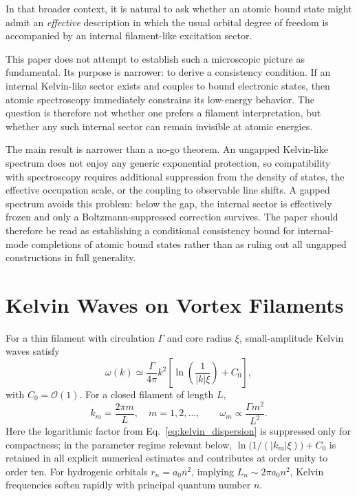 \documentclass[pdflatex,sn-mathphys-num]{sn-jnl}
\begin{document}
        In that broader context, it is natural to ask whether an atomic bound state might admit an \emph{effective} description in which the usual orbital degree of freedom is accompanied by an internal filament-like excitation sector.

        This paper does not attempt to establish such a microscopic picture as fundamental. Its purpose is narrower: to derive a consistency condition. If an internal Kelvin-like sector exists and couples to bound electronic states, then atomic spectroscopy immediately constrains its low-energy behavior. The question is therefore not whether one prefers a filament interpretation, but whether any such internal sector can remain invisible at atomic energies.

        The main result is narrower than a no-go theorem. An ungapped Kelvin-like spectrum does not enjoy any generic exponential protection, so compatibility with spectroscopy requires additional suppression from the density of states, the effective occupation scale, or the coupling to observable line shifts. A gapped spectrum avoids this problem: below the gap, the internal sector is effectively frozen and only a Boltzmann-suppressed correction survives. The paper should therefore be read as establishing a conditional consistency bound for internal-mode completions of atomic bound states rather than as ruling out all ungapped constructions in full generality.

    \section{Kelvin Waves on Vortex Filaments}\label{sec:kelvin}
        For a thin filament with circulation $\Gamma$ and core radius $\xi$, small-amplitude Kelvin waves satisfy \cite{LordKelvin1880,Barenghi2014}
        \begin{equation}
            \omega(k) \simeq \frac{\Gamma}{4\pi} k^2
            \left[
                \ln\!\left(\frac{1}{|k|\xi}\right) + C_0
            \right],
            \label{eq:kelvin_dispersion}
        \end{equation}
        with $C_0=\mathcal{O}(1)$. For a closed filament of length $L$,
        \begin{equation}
            k_m = \frac{2\pi m}{L}, \quad m=1,2,\dots,\qquad
            \omega_m \propto \frac{\Gamma m^2}{L^2}.
        \end{equation}
        Here the logarithmic factor from Eq.~\eqref{eq:kelvin_dispersion} is suppressed only for compactness; in the parameter regime relevant below, $\ln\!\bigl(1/(|k_m|\xi)\bigr)+C_0$ is retained in all explicit numerical estimates and contributes at order unity to order ten. For hydrogenic orbitals $r_n=a_0 n^2$, implying $L_n\sim 2\pi a_0 n^2$, Kelvin frequencies soften rapidly with principal quantum number $n$.
\end{document}
